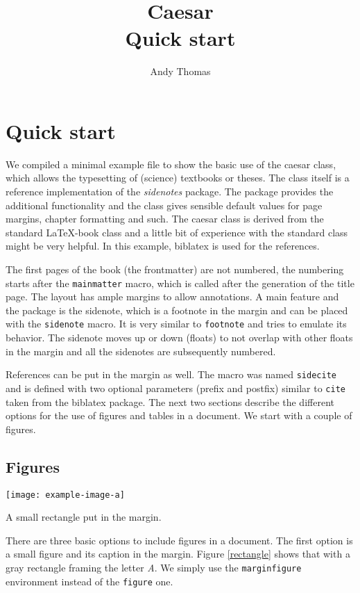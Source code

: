 \documentclass{caesar_book}
\title{Caesar\\Quick start}
\author{Andy Thomas}
\begin{document}
\frontmatter
\maketitlepage
\tableofcontents
\mainmatter
\chapter{Quick start}
%
We compiled a minimal example file to show the basic use of the caesar class, which allows the typesetting of (science) textbooks or theses. The class itself is a reference implementation of the \emph{sidenotes} package. The package provides the additional functionality and the class gives sensible default values for page margins, chapter formatting and such. The caesar class is derived from the standard \LaTeX-book class and a little bit of experience with the standard class might be very helpful. In this example, biblatex is used for the references.

The first pages of the book (the frontmatter) are not numbered, the numbering starts after the \texttt{mainmatter} macro, which is called after the generation of the title page. The layout has ample margins to allow annotations. A main feature and the package is the sidenote, which is a footnote in the margin and can be placed with the \texttt{sidenote} macro. It is very similar to \texttt{footnote} and tries to emulate its behavior. The sidenote moves up or down (floats) to not overlap with other floats in the margin and all the sidenotes are subsequently numbered. 

References can be put in the margin as well. The macro was named \texttt{sidecite} and is defined with two optional parameters (prefix and postfix) similar to \texttt{cite} taken from the biblatex package. The next two sections describe the different options for the use of figures and tables in a document. We start with a couple of figures.
\section{Figures}
%
\begin{marginfigure}%
    \texttt{[image: example-image-a]}%
    \caption{A small rectangle put in the margin.\label{rectangle}}%
\end{marginfigure}%
%
There are three basic options to include figures in a document. The first option is a small figure and its caption in the margin. Figure \ref{rectangle} shows that with a gray rectangle framing the letter \emph{A}. We simply use the \texttt{marginfigure} environment instead of the \texttt{figure} one. 
\end{document}
